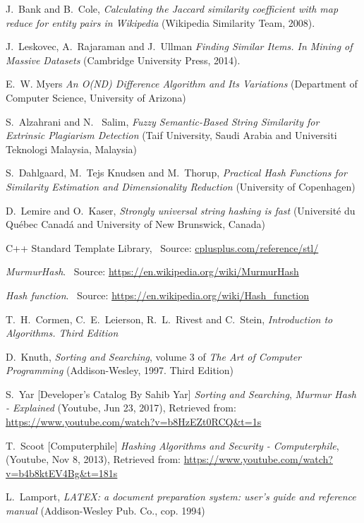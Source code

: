 \documentclass[12pt]{article}
\begin{document}
\clearpage
\begin{thebibliography}{100}

J.\ Bank and B.\ Cole,
\textit {Calculating the Jaccard similarity coefficient with map reduce for entity pairs in
Wikipedia} (Wikipedia Similarity Team, 2008).

J.\ Leskovec, A.\ Rajaraman and J.\ Ullman
\textit{ Finding Similar Items. In Mining of Massive Datasets} (Cambridge University Press, 2014).

E.\ W. Myers \textit{An O(ND) Difference Algorithm and Its Variations} (Department of Computer Science, University of Arizona)

S.\ Alzahrani and N. \ Salim, \textit{Fuzzy Semantic-Based String Similarity for Extrinsic Plagiarism Detection} (Taif University, Saudi Arabia and Universiti Teknologi Malaysia, Malaysia)

S.\ Dahlgaard, M.\ Tejs Knudsen and M.\ Thorup, \textit{Practical Hash Functions for Similarity Estimation and Dimensionality Reduction} (University of Copenhagen)

D.\ Lemire and O.\ Kaser, \textit{Strongly universal string hashing is fast} (Université du Québec Canadá and University of New Brunswick, Canada) 

C++ Standard Template Library,
\ Source: \url{cplusplus.com/reference/stl/}




\textit{MurmurHash}. \ Source: \url{https://en.wikipedia.org/wiki/MurmurHash}

\textit{Hash function}. \ Source: \url{https://en.wikipedia.org/wiki/Hash_function}

T.\ H.\ Cormen, C.\ E.\ Leierson, R.\ L.\ Rivest and C.\ Stein, \textit{Introduction to Algorithms. Third Edition}

D.\ Knuth,
\textit {Sorting and Searching}, volume 3 of \textit{The Art of Computer Programming} (Addison-Wesley, 1997. Third Edition)


S.\ Yar [Developer's Catalog By Sahib Yar]
\textit {Sorting and Searching}, \textit{Murmur Hash - Explained} (Youtube, Jun 23, 2017), Retrieved from: \url{https://www.youtube.com/watch?v=b8HzEZt0RCQ&t=1s}

T.\ Scoot [Computerphile]
\textit {Hashing Algorithms and Security - Computerphile}, (Youtube, Nov 8, 2013), Retrieved from: \url{https://www.youtube.com/watch?v=b4b8ktEV4Bg&t=181s}

L.\ Lamport, \textit{LATEX: a document preparation system: user's guide and reference manual} (Addison-Wesley Pub. Co., cop. 1994)

\end{thebibliography}
\end{document}
